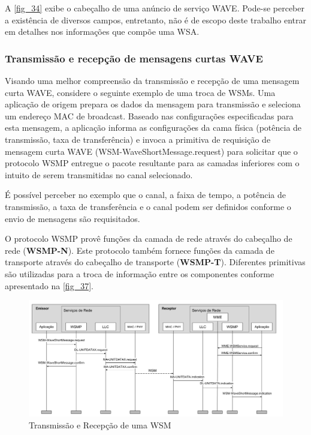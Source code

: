\documentclass[
12pt,				%
openright,			%
oneside,			%
a4paper,			%
brazil,				%
]{abntex2}
\begin{document}
	\par A \autoref{fig_34} exibe o cabeçalho de uma anúncio de serviço WAVE. Pode-se perceber a existência de diversos campos, entretanto, não é de escopo deste trabalho entrar em detalhes nos informações que compõe uma WSA.
	
	\subsubsection{Transmissão e recepção de mensagens curtas WAVE}
	\label{subsubsec:TransRecWSM}

	\par Visando uma melhor compreensão da transmissão e recepção de uma mensagem curta WAVE, considere o seguinte exemplo de uma troca de WSMs. Uma aplicação de origem prepara os dados da mensagem para transmissão e seleciona um endereço MAC de broadcast. Baseado nas configurações especificadas para esta mensagem, a aplicação informa as configurações da cama física (potência de transmissão, taxa de transferência) e invoca a primitiva de requisição de mensagem curta WAVE (WSM-WaveShortMessage.request) para solicitar que o protocolo WSMP entregue o pacote resultante para as camadas inferiores com o intuito de serem transmitidas no canal selecionado.

	\par É possível perceber no exemplo que o canal, a faixa de tempo, a potência de transmissão, a taxa de transferência e o canal podem ser definidos conforme o envio de mensagens são requisitados.	
	
	\par O protocolo WSMP provê funções da camada de rede através do cabeçalho de rede (\textbf{WSMP-N}). Este protocolo também fornece funções da camada de transporte através do cabeçalho de transporte (\textbf{WSMP-T}). Diferentes primitivas são utilizadas para a troca de informação entre os componentes conforme apresentado na \autoref{fig_37}.
	
	\begin{figure} [H]
		\includegraphics[scale=.4]{figuras/cap3/37TransmissaoRecepcaoWSM}
		\caption{\label{fig_37}Transmissão e Recepção de uma WSM}
	\end{figure}
\end{document}
